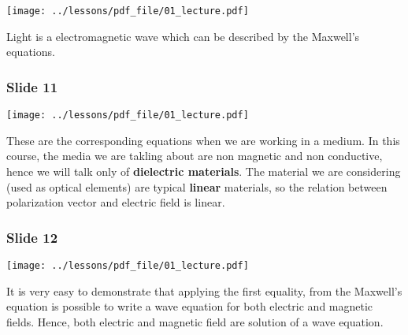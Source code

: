\documentclass[../main/main.tex]{subfiles}
\begin{document}
\begin{minipage}[]{0.5\linewidth}
\centering
\texttt{[image: ../lessons/pdf\_file/01\_lecture.pdf]}
\end{minipage}
\hspace{0.3cm}\vspace{0.3cm}
\begin{minipage}[c]{0.47\linewidth}
Light is a electromagnetic wave which can be described by the Maxwell's equations.
\end{minipage}

\subsubsection*{Slide 11}

\begin{minipage}[]{0.5\linewidth}
\centering
\texttt{[image: ../lessons/pdf\_file/01\_lecture.pdf]}
\end{minipage}
\hspace{0.3cm}\vspace{0.3cm}
\begin{minipage}[c]{0.47\linewidth}
These are the corresponding equations when we are working in a medium. In this course, the media we are takling about are non magnetic and non conductive, hence we will talk only of \textbf{dielectric materials}. The material we are considering (used as optical elements) are typical \textbf{linear} materials, so the relation between polarization vector and electric field is linear.
\end{minipage}

\subsubsection*{Slide 12}

\begin{minipage}[]{0.5\linewidth}
\centering
\texttt{[image: ../lessons/pdf\_file/01\_lecture.pdf]}
\end{minipage}
\hspace{0.3cm}\vspace{0.3cm}
\begin{minipage}[c]{0.47\linewidth}
It is very easy to demonstrate that applying the first equality, from the Maxwell's equation is possible to write a wave equation for both electric and magnetic fields. Hence, both electric and magnetic field are solution of a wave equation.
\end{minipage}
\end{document}
